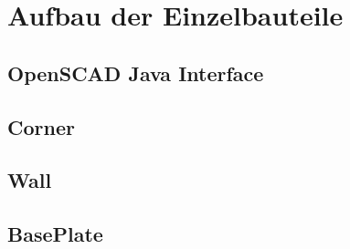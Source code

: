 \section{Aufbau der Einzelbauteile}
\subsection{OpenSCAD Java Interface}
\subsection{Corner}
\subsection{Wall}
\subsection{BasePlate}